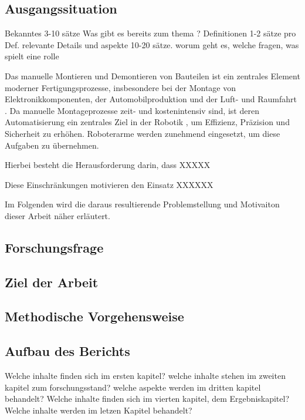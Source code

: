 \documentclass[12pt]{article}
\begin{document}
\subsection{Ausgangssituation}
Bekanntes 3-10 sätze Was gibt es bereits zum thema ?
Definitionen 1-2 sätze pro Def. 
relevante Details und aspekte 10-20 sätze. worum geht es, welche fragen, was spielt eine rolle

Das manuelle Montieren und Demontieren von Bauteilen ist ein zentrales Element moderner Fertigungsprozesse, insbesondere bei der Montage von Elektronikkomponenten, der Automobilproduktion und der Luft- und Raumfahrt \cite{manuelle_montage}. Da manuelle Montageprozesse zeit- und kostenintensiv sind, ist deren Automatisierung ein zentrales Ziel in der Robotik \cite{automation_aufwand}, um Effizienz, Präzision und Sicherheit zu erhöhen. Roboterarme werden zunehmend eingesetzt, um diese Aufgaben zu übernehmen\cite{robotics_manufacturing_replacement}.

Hierbei besteht die Herausforderung darin, dass XXXXX

Diese Einschränkungen motivieren den Einsatz XXXXXX 

Im Folgenden wird die daraus resultierende Problemstellung und Motivaiton dieser Arbeit näher erläutert.
	
\subsection{Forschungsfrage}

\subsection{Ziel der Arbeit}

\subsection{Methodische Vorgehensweise}

\subsection{Aufbau des Berichts}
Welche inhalte finden sich im ersten kapitel?
welche inhalte stehen im zweiten kapitel zum forschungsstand?
welche aspekte werden im dritten kapitel behandelt?
Welche inhalte finden sich im vierten kapitel, dem Ergebniskapitel?
Welche inhalte werden im letzen Kapitel behandelt?
\end{document}
